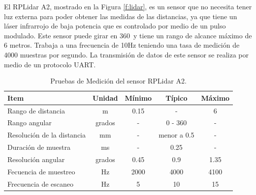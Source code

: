 
El RPLidar A2, mostrado en la Figura \ref{f:lidar}, es un sensor que no necesita tener 
luz externa para poder obtener las medidas de las distancias, ya que tiene 
un láser infrarrojo de baja potencia que es controlado por medio de un pulso 
modulado. Este sensor puede girar en 360\grad ~y tiene un rango de alcance máximo 
de 6 metros. Trabaja a una frecuencia de 10Hz teniendo una tasa de medición de 4000 
muestras por segundo. La transmisión de datos de este sensor se realiza por medio de un 
protocolo UART.




\begin{table}[htbp]
\begin{center}
\begin{tabular}{|l|c|c|c|c|}
	\hline
	Item & Unidad & M\'inimo & T\'ipico & M\'aximo\\
	\hline \hline
	Rango de distancia & m & 0.15 & - & 6 \\ \hline
	Rango angular & grados & - & 0 - 360 & - \\ \hline
	Resoluci\'on de la distancia & mm & - & menor a 0.5 & - \\ \hline
	Duraci\'on de muestra & ms & - & 0.25 & - \\ \hline
	Resoluci\'on angular & grados & 0.45 & 0.9 & 1.35 \\ \hline
	Fecuencia de muestreo & Hz & 2000 & 4000 & 4100 \\ \hline
	Frecuencia de escaneo & Hz & 5 & 10 & 15 \\ \hline
\end{tabular}
	\caption{Pruebas de Medici\'on del sensor RPLidar A2.}
	\label{tbl:medicion}
\end{center}
\end{table}

